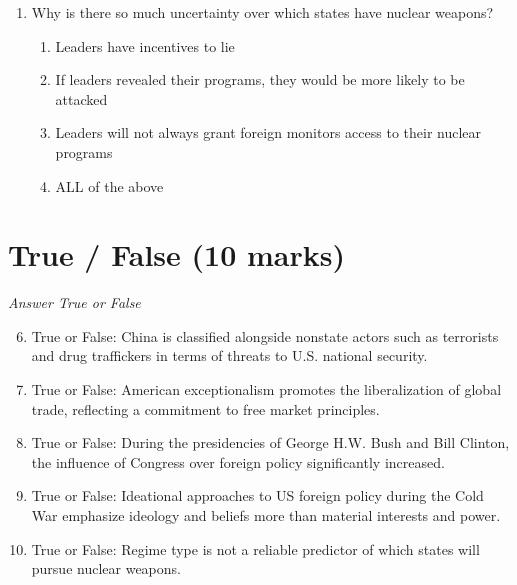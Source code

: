 \documentclass[12pt]{article}
\begin{document}
\begin{enumerate}[label=\arabic*.]
\begin{enumerate}[label=(\alph*)]
    \item the United Nations.
    \item the National Security Council.
    \item the State Department.
    \item the National Security Agency.
\end{enumerate}
\item Why is there so much uncertainty over which states have nuclear weapons?
\begin{enumerate}[label=(\alph*)]
    \item Leaders have incentives to lie
    \item If leaders revealed their programs, they would be more likely to be attacked
    \item Leaders will not always grant foreign monitors access to their nuclear programs
    \item ALL of the above
\end{enumerate}
\end{enumerate}

\section*{True / False (10 marks)}
\textit{Answer True or False}
\begin{enumerate}[label=\arabic*.]
\setcounter{enumi}{5}
\item True or False: China is classified alongside nonstate actors such as terrorists and drug traffickers in terms of threats to U.S. national security.
\item True or False: American exceptionalism promotes the liberalization of global trade, reflecting a commitment to free market principles.
\item True or False: During the presidencies of George H.W. Bush and Bill Clinton, the influence of Congress over foreign policy significantly increased.
\item True or False: Ideational approaches to US foreign policy during the Cold War emphasize ideology and beliefs more than material interests and power.
\item True or False: Regime type is not a reliable predictor of which states will pursue nuclear weapons.
\end{enumerate}
\end{document}
